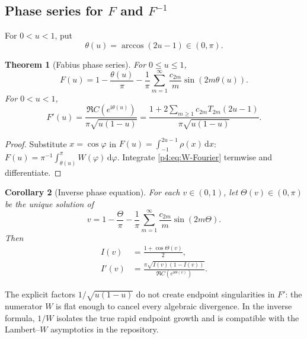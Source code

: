 \documentclass[11pt,oneside]{article}
\newtheorem{theorem}{Theorem}[section]
\newtheorem{corollary}[theorem]{Corollary}
\theoremstyle{definition}
\newcommand{\dd}{\,\mathrm d}
\newcommand{\ii}{\mathrm i}
\begin{document}
\subsection{Phase series for \(F\) and \(F^{-1}\)}

For \(0<u<1\), put
\begin{equation}
 \theta(u)=\arccos(2u-1)\in(0,\pi).
 \label{p4:eq:theta-u}
\end{equation}

\begin{theorem}[Fabius phase series]
\label{p4:thm:F-phase}
For \(0\le u\le1\),
\begin{equation}
 \boxed{\displaystyle
 F(u)=1-\frac{\theta(u)}{\pi}
 -\frac1\pi\sum_{m=1}^{\infty}\frac{c_{2m}}{m}\sin(2m\theta(u)).}
 \label{p4:eq:F-phase}
\end{equation}
For \(0<u<1\),
\begin{equation}
 F'(u)=\frac{\Re C(e^{\ii\theta(u)})}{\pi\sqrt{u(1-u)}}
 =\frac{1+2\sum_{m\ge1}c_{2m}T_{2m}(2u-1)}{\pi\sqrt{u(1-u)}}.
 \label{p4:eq:Fprime-C}
\end{equation}
\end{theorem}

\begin{proof}
Substitute \(x=\cos\varphi\) in \(F(u)=\int_{-1}^{2u-1}\rho(x)\dd x\):
\(F(u)=\pi^{-1}\int_{\theta(u)}^\pi W(\varphi)\dd\varphi\). Integrate
\eqref{p4:eq:W-Fourier} termwise and differentiate.
\end{proof}

\begin{corollary}[Inverse phase equation]
\label{p4:cor:inverse-phase}
For each \(v\in(0,1)\), let \(\Theta(v)\in(0,\pi)\) be the unique solution of
\begin{equation}
 v=1-\frac{\Theta}{\pi}
 -\frac1\pi\sum_{m=1}^{\infty}\frac{c_{2m}}{m}\sin(2m\Theta).
 \label{p4:eq:Theta-implicit}
\end{equation}
Then
\begin{align}
 I(v)&=\frac{1+\cos\Theta(v)}{2},
 \label{p4:eq:I-phase}\\
 I'(v)&=\frac{\pi\sqrt{I(v)(1-I(v))}}{\Re C(e^{\ii\Theta(v)})}.
 \label{p4:eq:Iprime-C}
\end{align}
\end{corollary}

The explicit factors \(1/\sqrt{u(1-u)}\) do not create endpoint singularities in \(F'\): the
numerator \(W\) is flat enough to cancel every algebraic divergence. In the inverse formula,
\(1/W\) isolates the true rapid endpoint growth and is compatible with the Lambert--\(W\)
asymptotics in the repository.
\end{document}
